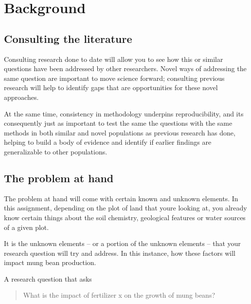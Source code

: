 \documentclass[
]{book}
\begin{document}
\hypertarget{background}{%
\section*{Background}\label{background}}

\hypertarget{consulting-the-literature}{%
\subsection*{Consulting the literature}\label{consulting-the-literature}}

Consulting research done to date will allow you to see how this or similar questions have been addressed by other researchers. Novel ways of addressing the same question are important to move science forward; consulting previous research will help to identify gaps that are opportunities for these novel approaches.

At the same time, consistency in methodology underpins reproducibility, and it\textquotesingle s consequently just as important to test the same the questions with the same methods in both similar and novel populations as previous research has done, helping to build a body of evidence and identify if earlier findings are generalizable to other populations.

\hypertarget{the-problem-at-hand}{%
\subsection*{The problem at hand}\label{the-problem-at-hand}}

The problem at hand will come with certain known and unknown elements. In this assignment, depending on the plot of land that you\textquotesingle re looking at, you already know certain things about the soil chemistry, geological features or water sources of a given plot.

It is the unknown elements -- or a portion of the unknown elements -- that your research question will try and address. In this instance, how these factors will impact mung bean production.

A research question that asks

\begin{quote}
What is the impact of fertilizer x on the growth of mung beans?
\end{quote}
\end{document}
